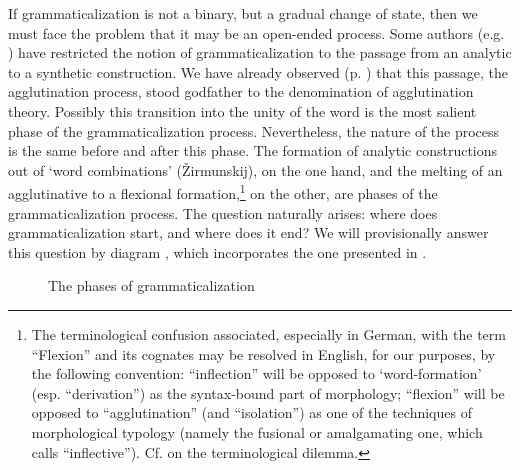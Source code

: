 If grammaticalization is not a binary, but a gradual change of state, then we must face the problem that it may be an open-ended process. Some authors (e.g. \citet[113--115]{Ronneberger-Sibold1980}) have restricted the notion of grammaticalization to the passage from an analytic to a synthetic construction. We have already observed (p. \pageref{Agglutinationstheorie}) that this passage, the agglutination process, stood godfather to the denomination of agglutination theory. Possibly this transition into the unity of the word is the most salient phase of the grammaticalization process. Nevertheless, the nature of the process is the same before and after this phase. The formation of analytic constructions out of ‘word combinations’ (Žirmunskij), on the one hand, and the melting  of an agglutinative to a flexional formation,\footnote{The terminological confusion associated, especially in German, with the term ``Flexion'' and its cognates may be resolved in English, for our purposes, by the following convention: ``inflection'' will be opposed to ‘word-formation’ (esp. ``derivation'') as the syntax-bound part of morphology; ``flexion'' will be opposed to ``agglutination'' (and ``isolation'') as one of the techniques of morphological typology (namely the fusional or amalgamating one, which \citet[129ff]{Sapir1921} calls ``inflective''). Cf. \citet[41f]{Comrie1981b} on the terminological dilemma.} on the other, are phases of the grammaticalization process. The question naturally arises: where does grammaticalization start, and where does it end? We will provisionally answer this question by diagram , which incorporates the one presented in \citet[209]{Givón1979b}.


\begin{figure}
\caption{The phases of grammaticalization} \label{fig:phases}
\end{figure}


